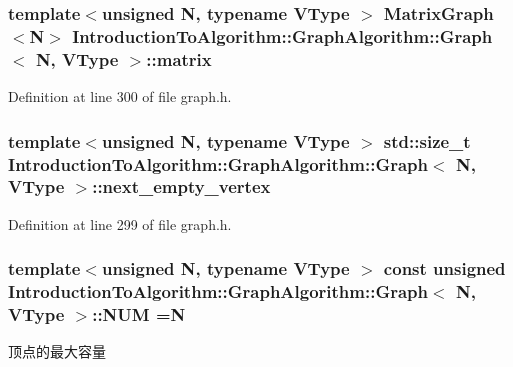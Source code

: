 \subsubsection[{matrix}]{\setlength{\rightskip}{0pt plus 5cm}template$<$unsigned N, typename V\+Type $>$ {\bf Matrix\+Graph}$<$N$>$ {\bf Introduction\+To\+Algorithm\+::\+Graph\+Algorithm\+::\+Graph}$<$ N, V\+Type $>$\+::matrix}\label{struct_introduction_to_algorithm_1_1_graph_algorithm_1_1_graph_a498323460ec613f12e1039afdca6c10a}


Definition at line 300 of file graph.\+h.

\hypertarget{struct_introduction_to_algorithm_1_1_graph_algorithm_1_1_graph_a07a8f2eafc8175787a6ce1f26f1252d0}{}
\subsubsection[{next\+\_\+empty\+\_\+vertex}]{\setlength{\rightskip}{0pt plus 5cm}template$<$unsigned N, typename V\+Type $>$ std\+::size\+\_\+t {\bf Introduction\+To\+Algorithm\+::\+Graph\+Algorithm\+::\+Graph}$<$ N, V\+Type $>$\+::next\+\_\+empty\+\_\+vertex}\label{struct_introduction_to_algorithm_1_1_graph_algorithm_1_1_graph_a07a8f2eafc8175787a6ce1f26f1252d0}


Definition at line 299 of file graph.\+h.

\hypertarget{struct_introduction_to_algorithm_1_1_graph_algorithm_1_1_graph_aba53db2c8cade306553fc1e03f138aa2}{}
\subsubsection[{N\+U\+M}]{\setlength{\rightskip}{0pt plus 5cm}template$<$unsigned N, typename V\+Type $>$ const unsigned {\bf Introduction\+To\+Algorithm\+::\+Graph\+Algorithm\+::\+Graph}$<$ N, V\+Type $>$\+::N\+U\+M =N\hspace{0.3cm}{\ttfamily [static]}}\label{struct_introduction_to_algorithm_1_1_graph_algorithm_1_1_graph_aba53db2c8cade306553fc1e03f138aa2}
顶点的最大容量 

